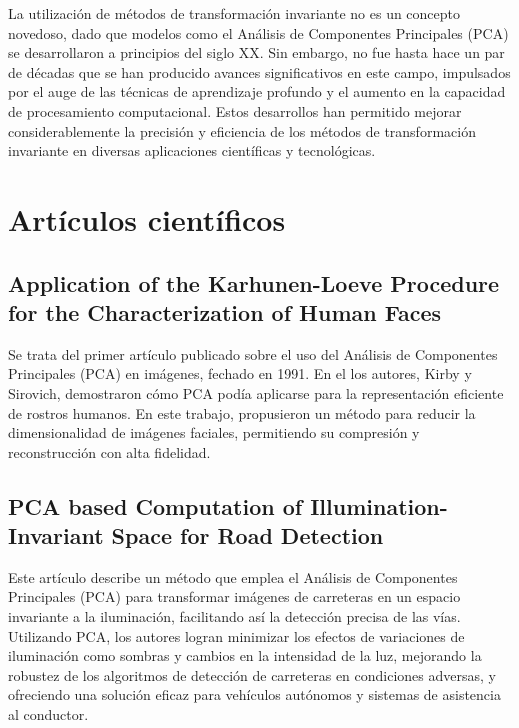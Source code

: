 
La utilización de métodos de transformación invariante no es un concepto novedoso, dado que modelos como el Análisis de Componentes Principales (PCA) se desarrollaron a principios del siglo XX. Sin embargo, no fue hasta hace un par de décadas que se han producido avances significativos en este campo, impulsados por el auge de las técnicas de aprendizaje profundo y el aumento en la capacidad de procesamiento computacional. Estos desarrollos han permitido mejorar considerablemente la precisión y eficiencia de los métodos de transformación invariante en diversas aplicaciones científicas y tecnológicas.

\section{Artículos científicos}\label{artículos-científicos}

\subsection{Application of the Karhunen-Loeve Procedure for the Characterization of Human Faces \cite{KirbyPCA}}\label{pca-1}

Se trata del primer artículo publicado sobre el uso del Análisis de Componentes Principales (PCA) en imágenes, fechado en 1991. En el los autores, Kirby y Sirovich, demostraron cómo PCA podía aplicarse para la representación eficiente de rostros humanos. En este trabajo, propusieron un método para reducir la dimensionalidad de imágenes faciales, permitiendo su compresión y reconstrucción con alta fidelidad.


\subsection{PCA based Computation of Illumination-Invariant Space for Road Detection \cite{pca2017}}\label{pca-2}

Este artículo describe un método que emplea el Análisis de Componentes Principales (PCA) para transformar imágenes de carreteras en un espacio invariante a la iluminación, facilitando así la detección precisa de las vías. Utilizando PCA, los autores logran minimizar los efectos de variaciones de iluminación como sombras y cambios en la intensidad de la luz, mejorando la robustez de los algoritmos de detección de carreteras en condiciones adversas, y ofreciendo una solución eficaz para vehículos autónomos y sistemas de asistencia al conductor.

